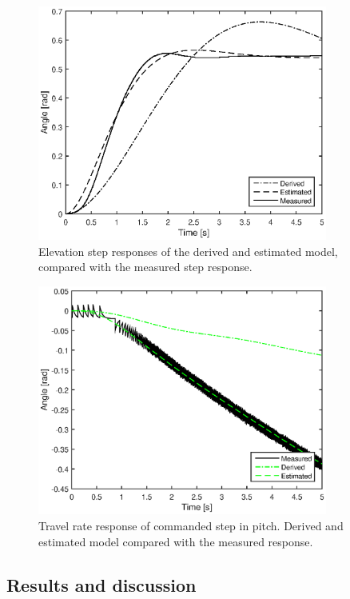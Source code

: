 \begin{figure}[hp]
	\centering
		\includegraphics[width=0.85\textwidth]{figures/1/elev_model_comparison.eps}
	\caption{Elevation step responses of the derived and estimated model, compared with the measured step response.}
	\label{fig:elev_model_comparison}
\end{figure}

\begin{figure}[hp]
	\centering
		\includegraphics[width=0.85\textwidth]{figures/1/travelRate_model_comparison.eps}
	\caption{Travel rate response of commanded step in pitch. Derived and estimated model compared with the measured response.}
	\label{fig:travelRate_model_comparison}
\end{figure}


\subsection{Results and discussion}
\label{subsection:part1_results}


